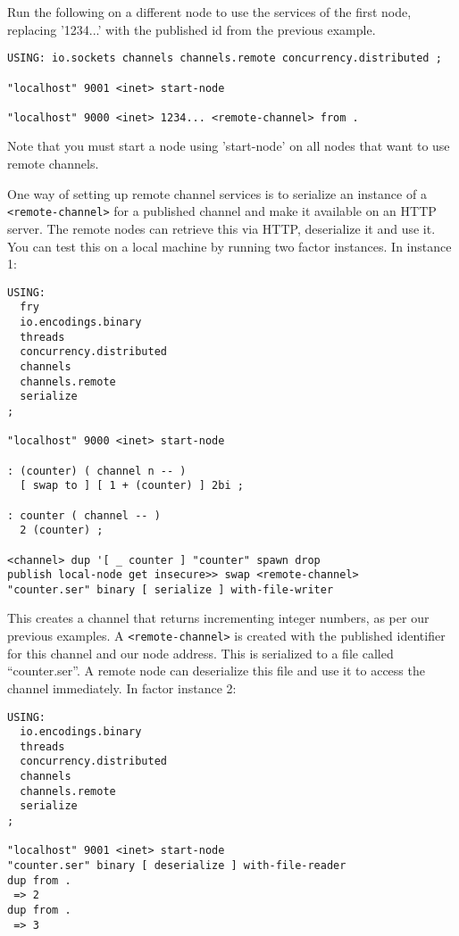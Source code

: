 Run the following on a different node to use the services of the first node,
replacing '1234...' with the published id from the previous example.

\begin{verbatim}
USING: io.sockets channels channels.remote concurrency.distributed ;

"localhost" 9001 <inet> start-node

"localhost" 9000 <inet> 1234... <remote-channel> from .
\end{verbatim}

Note that you must start a node using 'start-node' on all nodes that want to
use remote channels.

One way of setting up remote channel services is to serialize an instance of a \texttt{<remote-channel>} for a published channel and make it available on an HTTP server. The remote nodes can retrieve this via HTTP, deserialize it and use it. You can test this on a local machine by running two factor instances. In instance 1:

\begin{verbatim}
USING:
  fry 
  io.encodings.binary
  threads 
  concurrency.distributed 
  channels  
  channels.remote 
  serialize 
;

"localhost" 9000 <inet> start-node 

: (counter) ( channel n -- )
  [ swap to ] [ 1 + (counter) ] 2bi ;
    
: counter ( channel -- )
  2 (counter) ;    

<channel> dup '[ _ counter ] "counter" spawn drop 
publish local-node get insecure>> swap <remote-channel>
"counter.ser" binary [ serialize ] with-file-writer
\end{verbatim}

This creates a channel that returns incrementing integer numbers, as per our previous examples. A \texttt{<remote-channel>} is created with the published identifier for this channel and our node address. This is serialized to a file called ``counter.ser''. A remote node can deserialize this file and use it to access the channel immediately. In factor instance 2:

\begin{verbatim}
USING: 
  io.encodings.binary
  threads 
  concurrency.distributed 
  channels 
  channels.remote 
  serialize 
;

"localhost" 9001 <inet> start-node 
"counter.ser" binary [ deserialize ] with-file-reader
dup from .
 => 2
dup from .
 => 3
\end{verbatim}
